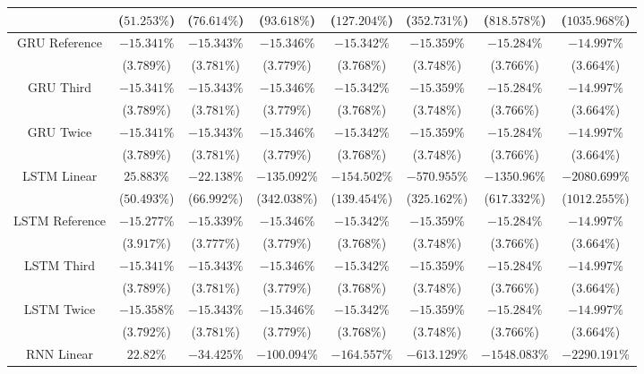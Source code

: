 \begin{table}[!ht]
{\begin{tabular}{|c|c|c|c|c|c|c|c|}
			 & ($51.253\%$) & ($76.614\%$) & ($93.618\%$) & ($127.204\%$) & ($352.731\%$) & ($818.578\%$) & ($1035.968\%$) \\ \hline
			\multirow{2}{*}{GRU Reference} & $-15.341\%$ & $-15.343\%$ & $-15.346\%$ & $-15.342\%$ & $-15.359\%$ & $-15.284\%$ & $-14.997\%$ \\
			 & ($3.789\%$) & ($3.781\%$) & ($3.779\%$) & ($3.768\%$) & ($3.748\%$) & ($3.766\%$) & ($3.664\%$) \\ \hline
			\multirow{2}{*}{GRU Third} & $-15.341\%$ & $-15.343\%$ & $-15.346\%$ & $-15.342\%$ & $-15.359\%$ & $-15.284\%$ & $-14.997\%$ \\
			 & ($3.789\%$) & ($3.781\%$) & ($3.779\%$) & ($3.768\%$) & ($3.748\%$) & ($3.766\%$) & ($3.664\%$) \\ \hline
			\multirow{2}{*}{GRU Twice} & $-15.341\%$ & $-15.343\%$ & $-15.346\%$ & $-15.342\%$ & $-15.359\%$ & $-15.284\%$ & $-14.997\%$ \\
			 & ($3.789\%$) & ($3.781\%$) & ($3.779\%$) & ($3.768\%$) & ($3.748\%$) & ($3.766\%$) & ($3.664\%$) \\ \hline
			\multirow{2}{*}{LSTM Linear} & $25.883\%$ & $-22.138\%$ & $-135.092\%$ & $-154.502\%$ & $-570.955\%$ & $-1350.96\%$ & $-2080.699\%$ \\
			 & ($50.493\%$) & ($66.992\%$) & ($342.038\%$) & ($139.454\%$) & ($325.162\%$) & ($617.332\%$) & ($1012.255\%$) \\ \hline
			\multirow{2}{*}{LSTM Reference} & $-15.277\%$ & $-15.339\%$ & $-15.346\%$ & $-15.342\%$ & $-15.359\%$ & $-15.284\%$ & $-14.997\%$ \\
			 & ($3.917\%$) & ($3.777\%$) & ($3.779\%$) & ($3.768\%$) & ($3.748\%$) & ($3.766\%$) & ($3.664\%$) \\ \hline
			\multirow{2}{*}{LSTM Third} & $-15.341\%$ & $-15.343\%$ & $-15.346\%$ & $-15.342\%$ & $-15.359\%$ & $-15.284\%$ & $-14.997\%$ \\
			 & ($3.789\%$) & ($3.781\%$) & ($3.779\%$) & ($3.768\%$) & ($3.748\%$) & ($3.766\%$) & ($3.664\%$) \\ \hline
			\multirow{2}{*}{LSTM Twice} & $-15.358\%$ & $-15.343\%$ & $-15.346\%$ & $-15.342\%$ & $-15.359\%$ & $-15.284\%$ & $-14.997\%$ \\
			 & ($3.792\%$) & ($3.781\%$) & ($3.779\%$) & ($3.768\%$) & ($3.748\%$) & ($3.766\%$) & ($3.664\%$) \\ \hline
			\multirow{2}{*}{RNN Linear} & $22.82\%$ & $-34.425\%$ & $-100.094\%$ & $-164.557\%$ & $-613.129\%$ & $-1548.083\%$ & $-2290.191\%$ \\

\end{tabular}}
\end{table}
